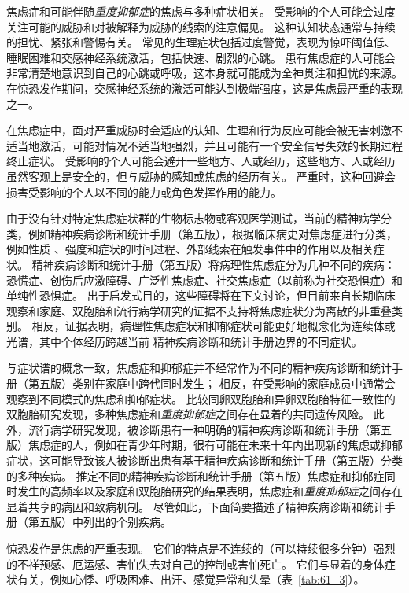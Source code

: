 焦虑症和可能伴随\textit{重度抑郁症}的焦虑与多种症状相关。
受影响的个人可能会过度关注可能的威胁和对被解释为威胁的线索的注意偏见。
这种认知状态通常与持续的担忧、紧张和警惕有关。
常见的生理症状包括过度警觉，表现为惊吓阈值低、睡眠困难和交感神经系统激活，包括快速、剧烈的心跳。
患有焦虑症的人可能会非常清楚地意识到自己的心跳或呼吸，这本身就可能成为全神贯注和担忧的来源。
在惊恐发作期间，交感神经系统的激活可能达到极端强度，这是焦虑最严重的表现之一。


在焦虑症中，面对严重威胁时会适应的认知、生理和行为反应可能会被无害刺激不适当地激活，可能对情况不适当地强烈，并且可能有一个安全信号失效的长期过程 终止症状。
受影响的个人可能会避开一些地方、人或经历，这些地方、人或经历虽然客观上是安全的，但与威胁的感知或焦虑的经历有关。
严重时，这种回避会损害受影响的个人以不同的能力或角色发挥作用的能力。


由于没有针对特定焦虑症状群的生物标志物或客观医学测试，当前的精神病学分类，例如精神疾病诊断和统计手册（第五版），根据临床病史对焦虑症进行分类，例如性质 、强度和症状的时间过程、外部线索在触发事件中的作用以及相关症状。
精神疾病诊断和统计手册（第五版）将病理性焦虑症分为几种不同的疾病：恐慌症、创伤后应激障碍、广泛性焦虑症、社交焦虑症（以前称为社交恐惧症）和单纯性恐惧症。
出于启发式目的，这些障碍将在下文讨论，但目前来自长期临床观察和家庭、双胞胎和流行病学研究的证据不支持将焦虑症状分为离散的非重叠类别。
相反，证据表明，病理性焦虑症状和抑郁症状可能更好地概念化为连续体或光谱，其中个体经历跨越当前 精神疾病诊断和统计手册边界的不同症状。


与症状谱的概念一致，焦虑症和抑郁症并不经常作为不同的精神疾病诊断和统计手册（第五版）类别在家庭中跨代同时发生；
相反，在受影响的家庭成员中通常会观察到不同模式的焦虑和抑郁症状。
比较同卵双胞胎和异卵双胞胎特征一致性的双胞胎研究发现，多种焦虑症和\textit{重度抑郁症}之间存在显着的共同遗传风险。
此外，流行病学研究发现，被诊断患有一种明确的精神疾病诊断和统计手册（第五版）焦虑症的人，例如在青少年时期，很有可能在未来十年内出现新的焦虑或抑郁症状，这可能导致该人被诊断出患有基于精神疾病诊断和统计手册（第五版）分类的多种疾病。
推定不同的精神疾病诊断和统计手册（第五版）焦虑症和抑郁症同时发生的高频率以及家庭和双胞胎研究的结果表明，焦虑症和\textit{重度抑郁症}之间存在显着共享的病因和致病机制。
尽管如此，下面简要描述了精神疾病诊断和统计手册（第五版）中列出的个别疾病。


惊恐发作是焦虑的严重表现。
它们的特点是不连续的（可以持续很多分钟）强烈的不祥预感、厄运感、害怕失去对自己的控制或害怕死亡。
它们与显着的身体症状有关，例如心悸、呼吸困难、出汗、感觉异常和头晕（表~\ref{tab:61_3}）。


